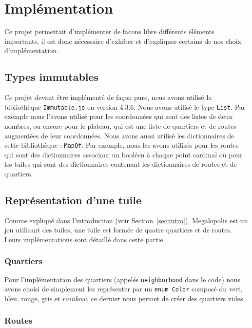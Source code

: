 \section{Implémentation}
\label{sec:implémentation}

Ce projet permettait d'implémenter de facons libre différents éléments importants, il est donc nécessaire d'exhiber et d'expliquer certains de nos choix d'implémentation.

\subsection{Types immutables}
\label{subsec:immutable}

Ce projet devant être implémenté de façon pure, nous avons utilisé la bibliothèque \texttt{Immutable.js} en version 4.3.6. Nous avons utilisé le type \texttt{List}. Par exemple nous l'avons utilisé pour les coordonnées qui sont des listes de deux nombres, ou encore pour le plateau, qui est une liste de quartiers et de routes augmentées de leur coordonnées. Nous avons aussi utilisé les dictionnaires de cette bibliothèque : \texttt{MapOf}. Par exemple, nous les avons utilisés pour les routes qui sont des dictionnaires associant un booléen à chaque point cardinal ou pour les tuiles qui sont des dictionnaires contenant les dictionnaires de routes et de quartiers.

\subsection{Représentation d'une tuile}
\label{subsec:tile}

Comme expliqué dans l'introduction (voir Section~\ref{sec:intro}), Megalopolis est un jeu utilisant des tuiles, une tuile est formée de quatre quartiers et de routes. Leurs implémentations sont détaillé dans cette partie.

\subsubsection{Quartiers}

Pour l'implémentation des quartiers (appelés \texttt{neighborhood} dans le code) nous avons choisi de simplement les représenter par un \texttt{enum Color} composé du vert, bleu, rouge, gris et $rainbow$, ce dernier nous permet de créer des quartiers vides.

\subsubsection{Routes}


